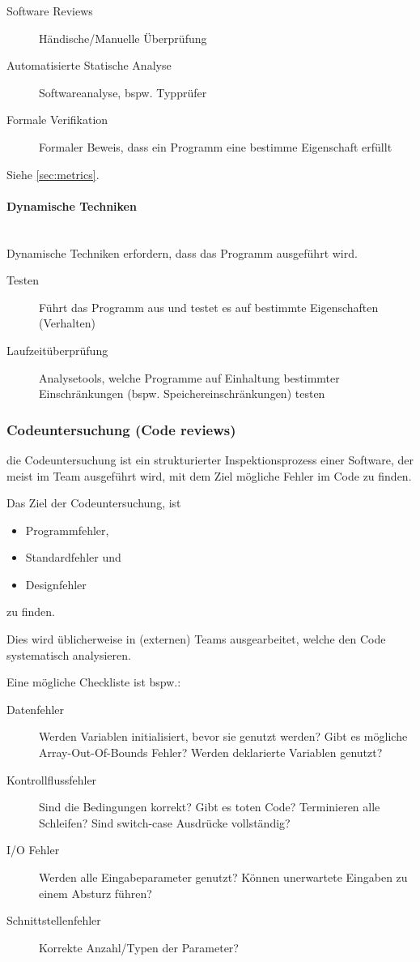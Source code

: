\documentclass[ngerman,color=3b]{tuda_summary}
\begin{document}
\begin{description}
    \item[Software Reviews] Händische/Manuelle Überprüfung
    \item[Automatisierte Statische Analyse] Softwareanalyse, bspw. Typprüfer
    \item[Formale Verifikation] Formaler Beweis, dass ein Programm eine bestimme Eigenschaft erfüllt
\end{description}

Siehe \ref{sec:metrics}.

\paragraph{Dynamische Techniken}\mbox{}\\
Dynamische Techniken erfordern, dass das Programm ausgeführt wird.

\begin{description}
    \item[Testen] Führt das Programm aus und testet es auf bestimmte Eigenschaften (Verhalten)
    \item[Laufzeitüberprüfung] Analysetools, welche Programme auf Einhaltung bestimmter Einschränkungen (bspw. Speichereinschränkungen) testen
\end{description}

\clearpage
\subsubsection{Codeuntersuchung (Code reviews)}
\begin{definition}
    die Codeuntersuchung ist ein strukturierter Inspektionsprozess einer Software,
    der meist im Team ausgeführt wird, mit dem Ziel mögliche Fehler im Code zu finden.
\end{definition}
Das Ziel der Codeuntersuchung, ist
\begin{itemize}
    \item Programmfehler,
    \item Standardfehler und
    \item Designfehler
\end{itemize}
zu finden.

Dies wird üblicherweise in (externen) Teams ausgearbeitet, welche den Code systematisch analysieren.

Eine mögliche Checkliste ist bspw.:
\begin{description}
    \item[Datenfehler] Werden Variablen initialisiert, bevor sie genutzt werden? Gibt es mögliche Array-Out-Of-Bounds Fehler? Werden deklarierte Variablen genutzt?
    \item[Kontrollflussfehler] Sind die Bedingungen korrekt? Gibt es toten Code? Terminieren alle Schleifen? Sind switch-case Ausdrücke vollständig?
    \item[I/O Fehler] Werden alle Eingabeparameter genutzt? Können unerwartete Eingaben zu einem Absturz führen?
    \item[Schnittstellenfehler] Korrekte Anzahl/Typen der Parameter?
\end{description}
\end{document}
